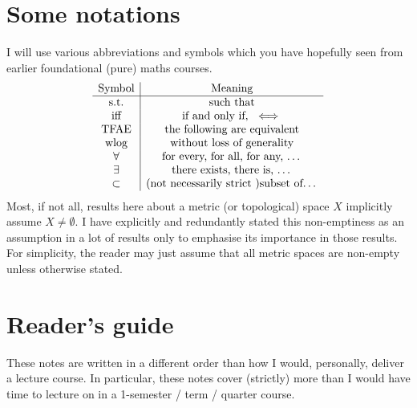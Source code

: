 \documentclass[12pt]{book}
\theoremstyle{remark}
\theoremstyle{definition}
\begin{document}
	\section{Some notations}
	I will use various abbreviations and symbols which you have hopefully seen from earlier foundational (pure) maths courses.
	\[
	\begin{array}{c|c}
	\text{Symbol} 	&\text{Meaning} 	\\\hline
	\text{s.t.} 	&\text{such that} 	\\
	\text{iff} 		&\text{if and only if, }\iff 	\\
	\text{TFAE} 	&\text{the following are equivalent} 	\\
	\text{wlog} 	&\text{without loss of generality} 	\\
	\forall 		&\text{for every, for all, for any, \dots} 	\\
	\exists 		&\text{there exists, there is, \dots} 	\\
	\subset 	&\text{(not necessarily strict )subset of\dots }
	\end{array}
	\]
	Most, if not all, results here about a metric (or topological) space $X$ implicitly assume $X\neq \emptyset$. I have explicitly and redundantly stated this non-emptiness as an assumption in a lot of results only to emphasise its importance in those results. For simplicity, the reader may just assume that all metric spaces are non-empty unless otherwise stated.
	\section{Reader's guide}
	\label{sec:guide}
	These notes are written in a different order than how I would, personally, deliver a lecture course. In particular, these notes cover (strictly) more than I would have time to lecture on in a 1-semester / term / quarter course.
	
\end{document}
